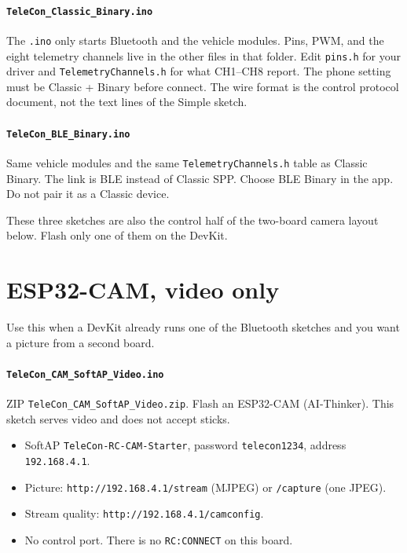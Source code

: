 \documentclass[12pt,a4paper]{article}
\begin{document}
\paragraph{\texttt{TeleCon\_Classic\_Binary.ino}}
The \texttt{.ino} only starts Bluetooth and the vehicle modules. Pins,
PWM, and the eight telemetry channels live in the other files in that
folder. Edit \texttt{pins.h} for your driver and
\texttt{TelemetryChannels.h} for what CH1--CH8 report. The phone setting
must be Classic + Binary before connect. The wire format is the control
protocol document, not the text lines of the Simple sketch.

\paragraph{\texttt{TeleCon\_BLE\_Binary.ino}}
Same vehicle modules and the same \texttt{TelemetryChannels.h} table as
Classic Binary. The link is BLE instead of Classic SPP. Choose BLE Binary
in the app. Do not pair it as a Classic device.

These three sketches are also the control half of the two-board camera
layout below. Flash only one of them on the DevKit.

\section{ESP32-CAM, video only}

Use this when a DevKit already runs one of the Bluetooth sketches and you
want a picture from a second board.

\paragraph{\texttt{TeleCon\_CAM\_SoftAP\_Video.ino}}
ZIP \texttt{TeleCon\_CAM\_SoftAP\_Video.zip}. Flash an ESP32-CAM
(AI-Thinker). This sketch serves video and does not accept sticks.

\begin{itemize}[leftmargin=1.4cm]
  \item SoftAP \texttt{TeleCon-RC-CAM-Starter}, password \texttt{telecon1234},
        address \texttt{192.168.4.1}.
  \item Picture: \texttt{http://192.168.4.1/stream} (MJPEG) or
        \texttt{/capture} (one JPEG).
  \item Stream quality: \texttt{http://192.168.4.1/camconfig}.
  \item No control port. There is no \texttt{RC:CONNECT} on this board.
\end{itemize}
\end{document}
